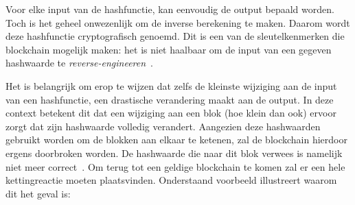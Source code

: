 Voor elke input van de hashfunctie, kan eenvoudig de output bepaald worden. Toch is het geheel onwezenlijk om de inverse berekening te maken. Daarom wordt deze hashfunctie cryptografisch genoemd. Dit is een van de sleutelkenmerken die blockchain mogelijk maken: het is niet haalbaar om de input van een gegeven hashwaarde te \textit{reverse-engineeren}~\autocite{Mansfield2018}. 

Het is belangrijk om erop te wijzen dat zelfs de kleinste wijziging aan de input van een hashfunctie, een drastische verandering maakt aan de output. In deze context betekent dit dat een wijziging aan een blok (hoe klein dan ook) ervoor zorgt dat zijn hashwaarde volledig verandert. Aangezien deze hashwaarden gebruikt worden om de blokken aan elkaar te ketenen, zal de blockchain hierdoor ergens doorbroken worden. De hashwaarde die naar dit blok verwees is namelijk niet meer correct~\autocite{Salem2008}. Om terug tot een geldige blockchain te komen zal er een hele kettingreactie moeten plaatsvinden. Onderstaand voorbeeld illustreert waarom dit het geval is:

